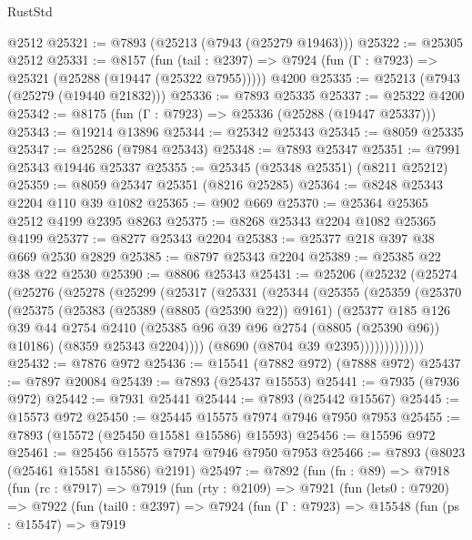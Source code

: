 \begin{lexlean}{RustStd}
\begin{coremodule}
    @2512
@25321 := @7893 (@25213 (@7943 (@25279 @19463)))
@25322 := @25305 @2512
@25331 := @8157
    (fun (tail : @2397) => @7924 (fun (Γ : @7923) => @25321 (@25288 (@19447 (@25322 @7955)))))
    @4200
@25335 := @25213 (@7943 (@25279 (@19440 @21832)))
@25336 := @7893 @25335
@25337 := @25322 @4200
@25342 := @8175 (fun (Γ : @7923) => @25336 (@25288 (@19447 @25337)))
@25343 := @19214 @13896
@25344 := @25342 @25343
@25345 := @8059 @25335
@25347 := @25286 (@7984 @25343)
@25348 := @7893 @25347
@25351 := @7991 @25343 @19446 @25337
@25355 := @25345 (@25348 @25351) (@8211 @25212)
@25359 := @8059 @25347 @25351 (@8216 @25285)
@25364 := @8248 @25343 @2204 @110 @39 @1082
@25365 := @902 @669
@25370 := @25364 @25365 @2512 @4199 @2395 @8263
@25375 := @8268 @25343 @2204 @1082 @25365 @4199
@25377 := @8277 @25343 @2204
@25383 := @25377 @218 @397 @38 @669 @2530 @2829
@25385 := @8797 @25343 @2204
@25389 := @25385 @22 @38 @22 @2530
@25390 := @8806 @25343
@25431 := @25206
    (@25232
      (@25274
        (@25276
          (@25278
            (@25299
              (@25317
                (@25331
                  (@25344
                    (@25355
                      (@25359
                        (@25370
                          (@25375
                            (@25383
                              (@25389 (@8805 (@25390 @22)) @9161)
                              (@25377
                                @185
                                @126
                                @39
                                @44
                                @2754
                                @2410
                                (@25385 @96 @39 @96 @2754 (@8805 (@25390 @96)) @10186)
                                (@8359 @25343 @2204))))
                          (@8690 (@8704 @39 @2395)))))))))))))
@25432 := @7876 @972
@25436 := @15541 (@7882 @972) (@7888 @972)
@25437 := @7897 @20084
@25439 := @7893 (@25437 @15553)
@25441 := @7935 (@7936 @972)
@25442 := @7931 @25441
@25444 := @7893 (@25442 @15567)
@25445 := @15573 @972
@25450 := @25445 @15575 @7974 @7946 @7950 @7953
@25455 := @7893 (@15572 (@25450 @15581 @15586) @15593)
@25456 := @15596 @972
@25461 := @25456 @15575 @7974 @7946 @7950 @7953
@25466 := @7893 (@8023 (@25461 @15581 @15586) @2191)
@25497 := @7892
    (fun (fn : @89) =>
    @7918
      (fun (rc : @7917) =>
      @7919
        (fun (rty : @2109) =>
        @7921
          (fun (lets0 : @7920) =>
          @7922
            (fun (tail0 : @2397) =>
            @7924
              (fun (Γ : @7923) =>
              @15548
                (fun (ps : @15547) =>
                @7919

\end{coremodule}
\end{lexlean}
